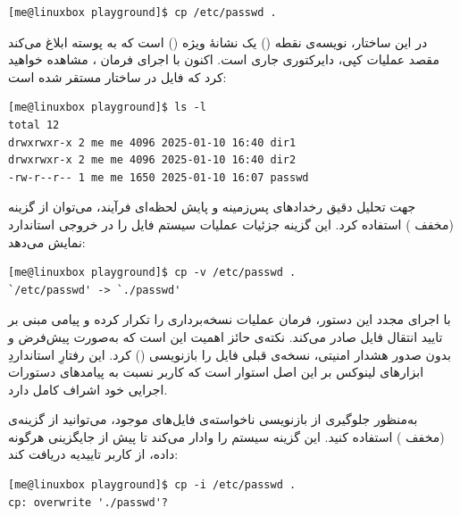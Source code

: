 \begin{latin}
\begin{lstlisting}
[me@linuxbox playground]$ cp /etc/passwd .
\end{lstlisting}
\end{latin}

در این ساختار، نویسه‌ی نقطه () یک نشانهٔ ویژه () است که به پوسته ابلاغ می‌کند مقصد عملیات کپی، دایرکتوری جاری است. اکنون با اجرای فرمان ، مشاهده خواهید کرد که فایل  در ساختار  مستقر شده است:

\begin{latin}
\begin{lstlisting}
[me@linuxbox playground]$ ls -l
total 12
drwxrwxr-x 2 me me 4096 2025-01-10 16:40 dir1
drwxrwxr-x 2 me me 4096 2025-01-10 16:40 dir2
-rw-r--r-- 1 me me 1650 2025-01-10 16:07 passwd
\end{lstlisting}
\end{latin}

جهت تحلیل دقیق رخدادهای پس‌زمینه و پایش لحظه‌ای فرآیند، می‌توان از گزینه  (مخفف ) استفاده کرد. این گزینه جزئیات عملیات سیستم‌ فایل را در خروجی استاندارد نمایش می‌دهد:

\begin{latin}
\begin{lstlisting}
[me@linuxbox playground]$ cp -v /etc/passwd .
`/etc/passwd' -> `./passwd'
\end{lstlisting}
\end{latin}

با اجرای مجدد این دستور، فرمان  عملیات نسخه‌برداری را تکرار کرده و پیامی مبنی بر تایید انتقال فایل صادر می‌کند. نکته‌ی حائز اهمیت این است که  به‌صورت پیش‌فرض و بدون صدور هشدار امنیتی، نسخه‌ی قبلی فایل را بازنویسی () کرد. این رفتارِ استانداردِ ابزارهای لینوکس بر این اصل استوار است که کاربر نسبت به پیامدهای دستورات اجرایی خود اشراف کامل دارد.

به‌منظور جلوگیری از بازنویسی ناخواسته‌ی فایل‌های موجود، می‌توانید از گزینه‌ی  (مخفف ) استفاده کنید. این گزینه سیستم را وادار می‌کند تا پیش از جایگزینی هرگونه داده، از کاربر تاییدیه دریافت کند:

\begin{latin}
\begin{lstlisting}
[me@linuxbox playground]$ cp -i /etc/passwd .
cp: overwrite './passwd'?
\end{lstlisting}
\end{latin}

